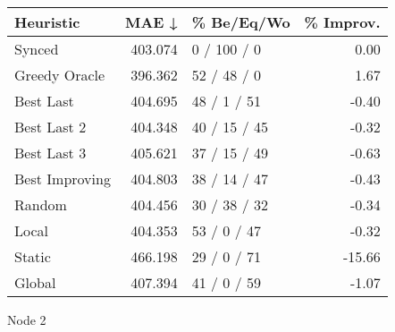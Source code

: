 \begin{tabular}{lrlr}
\toprule
\textbf{Heuristic} & \textbf{MAE ↓} & \textbf{\% Be/Eq/Wo} & \textbf{\% Improv.} \\
\midrule
            Synced &        403.074 &          0 / 100 / 0 &                0.00 \\
     Greedy Oracle &        396.362 &          52 / 48 / 0 &                1.67 \\
         Best Last &        404.695 &          48 / 1 / 51 &               -0.40 \\
       Best Last 2 &        404.348 &         40 / 15 / 45 &               -0.32 \\
       Best Last 3 &        405.621 &         37 / 15 / 49 &               -0.63 \\
    Best Improving &        404.803 &         38 / 14 / 47 &               -0.43 \\
            Random &        404.456 &         30 / 38 / 32 &               -0.34 \\
             Local &        404.353 &          53 / 0 / 47 &               -0.32 \\
            Static &        466.198 &          29 / 0 / 71 &              -15.66 \\
            Global &        407.394 &          41 / 0 / 59 &               -1.07 \\
\bottomrule
\end{tabular}
\caption{Node 2}
\label{tab:iid_lr05_le2_bs4_2}
